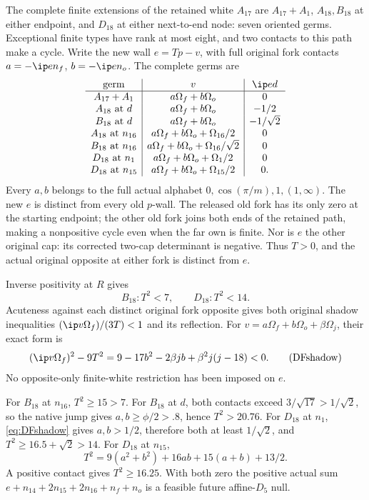 The complete finite extensions of the retained white \(A_{17}\)
are \(A_{17}+A_1\), \(A_{18},B_{18}\) at either endpoint,
and \(D_{18}\) at either next-to-end node: seven oriented germs.
Exceptional finite types have rank at most eight, and two contacts
to this path make a cycle.
Write the new wall \(e=Tp-v\), with full original fork contacts
\(a=-\ip e{n_f}\), \(b=-\ip e{n_o}\).
The complete germs are
\[
\begin{array}{c|c|c}
\text{germ}&v&\ip ed\\ \hline
A_{17}+A_1&a\Omega_f+b\Omega_o&0\\
A_{18}\text{ at }d&a\Omega_f+b\Omega_o&-1/2\\
B_{18}\text{ at }d&a\Omega_f+b\Omega_o&-1/\sqrt2\\
A_{18}\text{ at }n_{16}&a\Omega_f+b\Omega_o+\Omega_{16}/2&0\\
B_{18}\text{ at }n_{16}&a\Omega_f+b\Omega_o+\Omega_{16}/\sqrt2&0\\
D_{18}\text{ at }n_1&a\Omega_f+b\Omega_o+\Omega_1/2&0\\
D_{18}\text{ at }n_{15}&a\Omega_f+b\Omega_o+\Omega_{15}/2&0 .
\end{array}
\]
Every \(a,b\) belongs to the full actual alphabet
\(0,\cos(\pi/m),1,(1,\infty)\).
The new \(e\) is distinct from every old \(p\)-wall.
The released old fork has its only zero at the starting endpoint;
the other old fork joins both ends of the retained path,
making a nonpositive cycle even when the far own is finite.
Nor is \(e\) the other original cap: its corrected two-cap
determinant is negative.
Thus \(T>0\), and the actual original opposite at either fork is
distinct from \(e\).

Inverse positivity at \(R\) gives
\[
 B_{18}: T^2<7,\qquad D_{18}:T^2<14.
\]
Acuteness against each distinct original fork opposite gives both
original shadow inequalities
\((\ip v{\Omega_f})/(3T)<1\) and its reflection.
For \(v=a\Omega_f+b\Omega_o+\beta\Omega_j\), their exact form is
\[
 (\ip v{\Omega_f})^2-9T^2
   =9-17b^2-2\beta jb+\beta^2j(j-18)<0 .
\tag{DFshadow}\label{eq:DFshadow}
\]
No opposite-only finite-white restriction has been imposed on \(e\).

For \(B_{18}\) at \(n_{16}\), \(T^2\ge15>7\).
For \(B_{18}\) at \(d\), both contacts exceed
\(3/\sqrt{17}>1/\sqrt2\), so the native jump gives
\(a,b\ge\phi/2>.8\), hence \(T^2>20.76\).
For \(D_{18}\) at \(n_1\),
\eqref{eq:DFshadow} gives \(a,b>1/2\), therefore both at least
\(1/\sqrt2\), and \(T^2\ge16.5+\sqrt2>14\).
For \(D_{18}\) at \(n_{15}\),
\[
 T^2=9(a^2+b^2)+16ab+15(a+b)+13/2 .
\]
A positive contact gives \(T^2\ge16.25\).
With both zero the positive actual sum
\(e+n_{14}+2n_{15}+2n_{16}+n_f+n_o\)
is a feasible future affine-\(D_5\) null.

